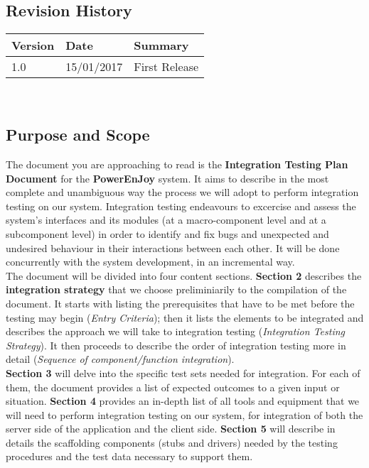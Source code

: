 \subsection{Revision History}
	\begin{tabular}{ |l|l|l| }
		\hline
		Version & Date & Summary\\ \hline
		1.0 & 15/01/2017 & First Release\\ \hline
	\end{tabular}
	\\

\subsection{Purpose and Scope}
	The document you are approaching to read is the \textbf{Integration Testing Plan Document} for the \textbf{PowerEnJoy} system. It aims to describe in the most complete and unambiguous way the process we will adopt to perform integration testing on our system. Integration testing endeavours to excercise and assess the system's interfaces and its modules (at a macro-component level and at a subcomponent level) in order to identify and fix bugs and unexpected and undesired behaviour in their interactions between each other. It will be done concurrently with the system development, in an incremental way.\\
	The document will be divided into four content sections. \textbf{Section 2} describes the \textbf{integration strategy} that we choose preliminiarily to the compilation of the document. It starts with listing the prerequisites that have to be met before the testing may begin (\textit{Entry Criteria}); then it lists the elements to be integrated and describes the approach we will take to integration testing (\textit{Integration Testing Strategy}). It then proceeds to describe the order of integration testing more in detail (\textit{Sequence of component/function integration}).\\
	\textbf{Section 3} will delve into the specific test sets needed for integration. For each of them, the document provides a list of expected outcomes to a given input or situation. \textbf{Section 4} provides an in-depth list of all tools and equipment that we will need to perform integration testing on our system, for integration of both the server side of the application and the client side. \textbf{Section 5} will describe in details the scaffolding components (stubs and drivers) needed by the testing procedures and the test data necessary to support them.

